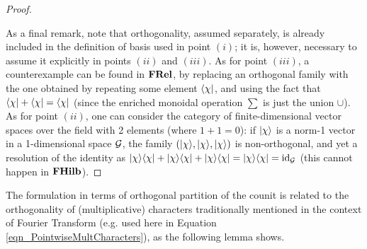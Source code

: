 \begin{proof}
\begin{itemize}
\end{itemize}

As a final remark, note that orthogonality, assumed separately, is already included in the definition of basis used in point $(i)$; it is, however, necessary to assume it explicitly in points $(ii)$ and $(iii)$. As for point $(iii)$, a counterexample can be found in $\mathbf{FRel}$, by replacing an orthogonal family with the one obtained by repeating some element $\langle \chi |$, and using the fact that $\langle \chi | + \langle \chi | = \langle \chi |$ (since the enriched monoidal operation $\sum$ is just the union $\cup$). As for point $(ii)$, one can consider the category of finite-dimensional vector spaces over the field with 2 elements (where $1+1=0$): if $| \chi \rangle$ is a norm-1 vector in a 1-dimensional space $\mathcal{G}$, the family $(| \chi \rangle,| \chi \rangle,| \chi \rangle)$ is non-orthogonal, and yet a resolution of the identity as $| \chi \rangle\langle \chi |+| \chi \rangle\langle \chi |+| \chi \rangle\langle \chi | = | \chi \rangle\langle \chi | = \mbox{id}_{\mathcal{G}}$ (this cannot happen in $\mathbf{FHilb}$).
\end{proof}

The formulation in terms of orthogonal partition of the counit is related to the orthogonality of (multiplicative) characters traditionally mentioned in the context of Fourier Transform (e.g. used here in Equation \ref{eqn_PointwiseMultCharacters}), as the following lemma shows. 

